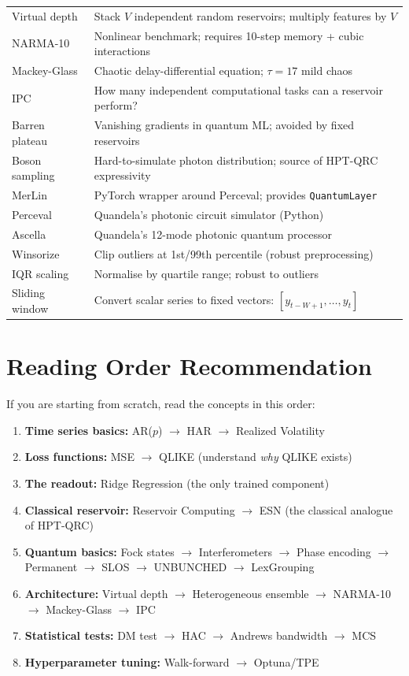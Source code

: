 \documentclass[11pt]{article}
\begin{document}
\begin{center}
\begin{tabular}{p{3cm} p{11cm}}
Virtual depth & Stack $V$ independent random reservoirs; multiply features by $V$ \\
NARMA-10 & Nonlinear benchmark; requires 10-step memory + cubic interactions \\
Mackey-Glass & Chaotic delay-differential equation; $\tau=17$ mild chaos \\
IPC & How many independent computational tasks can a reservoir perform? \\
Barren plateau & Vanishing gradients in quantum ML; avoided by fixed reservoirs \\
Boson sampling & Hard-to-simulate photon distribution; source of HPT-QRC expressivity \\
MerLin & PyTorch wrapper around Perceval; provides \texttt{QuantumLayer} \\
Perceval & Quandela's photonic circuit simulator (Python) \\
Ascella & Quandela's 12-mode photonic quantum processor \\
Winsorize & Clip outliers at 1st/99th percentile (robust preprocessing) \\
IQR scaling & Normalise by quartile range; robust to outliers \\
Sliding window & Convert scalar series to fixed vectors: $[y_{t-W+1},\ldots,y_t]$ \\
\bottomrule
\end{tabular}
\end{center}

\clearpage
\section*{Reading Order Recommendation}

If you are starting from scratch, read the concepts in this order:

\begin{enumerate}
  \item \textbf{Time series basics:} AR($p$) $\to$ HAR $\to$ Realized Volatility
  \item \textbf{Loss functions:} MSE $\to$ QLIKE (understand \emph{why} QLIKE exists)
  \item \textbf{The readout:} Ridge Regression (the only trained component)
  \item \textbf{Classical reservoir:} Reservoir Computing $\to$ ESN
        (the classical analogue of HPT-QRC)
  \item \textbf{Quantum basics:} Fock states $\to$ Interferometers $\to$
        Phase encoding $\to$ Permanent $\to$ SLOS $\to$ UNBUNCHED $\to$
        LexGrouping
  \item \textbf{Architecture:} Virtual depth $\to$ Heterogeneous ensemble $\to$
        NARMA-10 $\to$ Mackey-Glass $\to$ IPC
  \item \textbf{Statistical tests:} DM test $\to$ HAC $\to$ Andrews bandwidth
        $\to$ MCS
  \item \textbf{Hyperparameter tuning:} Walk-forward $\to$ Optuna/TPE
\end{enumerate}
\end{document}
